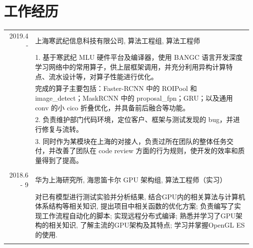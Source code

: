 \documentclass[a4paper,11pt]{article}
\begin{document}
\section{工作经历}
\begin{tabular}{r|p{11cm}}
 \textsc{2019.4 - } & 上海寒武纪信息科技有限公司, 算法工程组, 算法工程师 \\&\footnotesize{1. 基于寒武纪 MLU 硬件平台及编译器，使用 BANGC 语言开发深度学习网络中的常用算子，供上层框架调用，并充分利用异构计算特点、流水设计等，对算子性能进行优化。}\\&\footnotesize{完成的算子主要包括：Faster-RCNN 中的 ROIPool 和 image\_detect；MaskRCNN 中的 proposal\_fpn；GRU；以及通用 conv 的小 cico 折叠优化，并具备前后融合等功能。}\\&\footnotesize{2. 负责维护部门代码环境，定位客户、框架与测试发现的 bug，并进行修复与流转。}\\&\footnotesize{3. 同时作为某模块在上海的对接人，负责过所在团队的整体任务交付，并改善了团队在 code review 方面的行为规则，使开发的效率和质量得到了提高。}\\\multicolumn{2}{c}{} \\
 \textsc{2018.6 - 9} & 华为上海研究所, 海思笛卡尔 GPU 架构组, 算法工程师（实习） \\&\footnotesize{对已有模型进行测试实验并分析结果, 结合GPU内的相关算法与计算机体系结构等相关知识, 提出项目中相关函数的优化方案; 负责编写了实现工作流程自动化的脚本; 实现远程分布式编译; 熟悉并学习了GPU架构的相关知识, 了解主流的GPU架构及其特点; 学习并掌握OpenGL ES的使用.}\\\multicolumn{2}{c}{} \\
\end{tabular}

\end{document}

